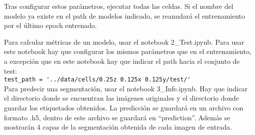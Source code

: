 Tras configurar estos parámetros, ejecutar todas las celdas. Si el nombre del modelo ya existe en el path de modelos indicado, se reanudará el entrenamiento por el último epoch entrenado.

Para calcular métricas de un modelo, usar el notebook 2\_Test.ipynb. Para usar este notebook hay que configurar los mismos parámetros que en el entrenamiento, a excepción que en este notebook hay que indicar el path hacia el conjunto de test:\\

\verb|test_path = '../data/cells/0.25z 0.125x 0.125y/test/'|\\

Para predecir una segmentación, usar el notebook 3\_Infe.ipynb. Hay que indicar el directorio donde se encuentran las imágenes originales y el directorio donde guardar los etiquetados obtenidos. La predicción se guardará en un archivo con formato .h5, dentro de este archivo se guardará en ``prediction''. Además se mostrarán 4 capas de la segmentación obtenida de cada imagen de entrada.